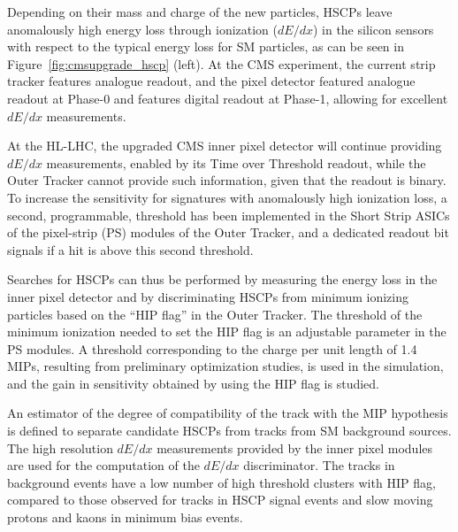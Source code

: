 Depending on their mass and charge of the new particles, HSCPs leave anomalously high energy loss through ionization ($dE/dx$) in the silicon sensors with respect to the typical energy loss for SM particles, as can be seen in Figure~\ref{fig:cmsupgrade_hscp} (left).
At the CMS experiment, the current strip tracker features analogue readout, and the pixel detector featured analogue
readout at Phase-0 and features digital readout at Phase-1, allowing for excellent $dE/dx$ measurements.

At the HL-LHC, the upgraded CMS inner pixel detector will continue providing $dE/dx$ measurements, enabled
by its Time over Threshold readout, while the Outer Tracker cannot provide such information, given that the readout is binary. 
To increase the sensitivity for signatures with anomalously high ionization loss, a second, programmable, threshold has been implemented in the Short
Strip ASICs of the pixel-strip (PS) modules of the Outer Tracker, and a dedicated readout bit signals if a
hit is above this second threshold.  

Searches for HSCPs can thus be performed by measuring the energy loss in the inner pixel detector and by
discriminating HSCPs from minimum ionizing particles based on the ``HIP flag'' in the Outer
Tracker. The threshold of the minimum ionization needed to set the HIP flag is an adjustable
parameter in the PS modules. A threshold corresponding to the charge per unit length of 1.4
MIPs, resulting from preliminary optimization studies, is used in the simulation, and the gain
in sensitivity obtained by using the HIP flag is studied.

An estimator of the degree of compatibility of the track with the MIP hypothesis is defined
to separate candidate HSCPs from tracks from SM background sources. The high resolution
$dE/dx$ measurements provided by the inner pixel modules are used for the computation of
the $dE/dx$ discriminator. 
The tracks in background events have a low number of high threshold clusters with HIP flag, compared to those observed for
tracks in HSCP signal events and slow moving protons and kaons in minimum bias events.

